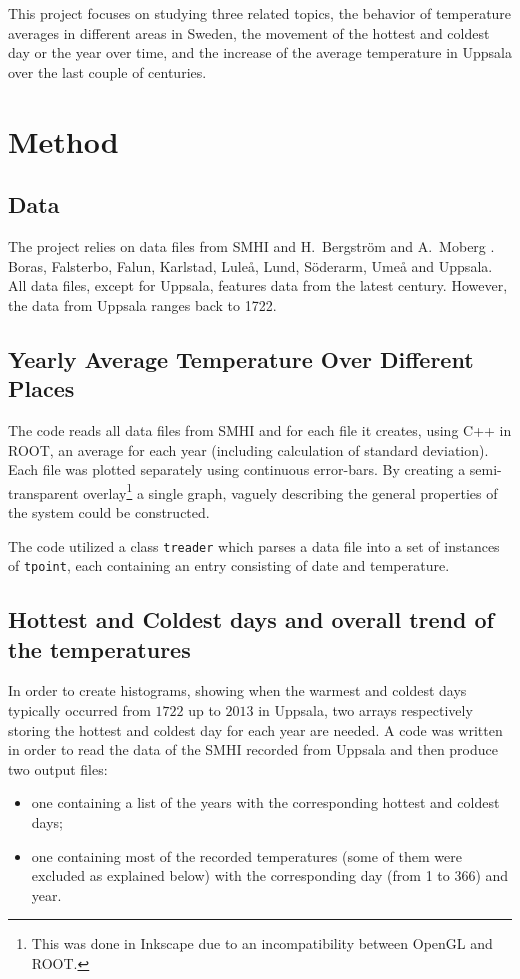 \documentclass[a4paper]{article}
\begin{document}
This project focuses on studying three related topics, the behavior of temperature averages in different areas in Sweden, the movement of the hottest and coldest day or the year over time, and the increase of the average temperature in Uppsala over the last couple of centuries.

\section{Method}\label{sec:Methods}

\subsection{Data}
The project relies on data files from SMHI and H.~Bergström and A.~Moberg \cite{Uppsala}. Boras, Falsterbo, Falun, Karlstad, Luleå, Lund, Söderarm, Umeå and Uppsala. All data files, except for Uppsala, features data from the latest century. However, the data from Uppsala ranges back to 1722.

\subsection{Yearly Average Temperature Over Different Places}

The code reads all data files from SMHI and for each file it creates, using C++ in ROOT, an average for each year (including calculation of standard deviation). Each file was plotted separately using continuous error-bars. By creating a semi-transparent overlay\footnote{This was done in Inkscape due to an incompatibility between OpenGL and ROOT.} a single graph, vaguely describing the general properties of the system could be constructed.

The code utilized a class \texttt{treader} which parses a data file into a set of instances of \texttt{tpoint}, each containing an entry consisting of date and temperature.


\subsection{Hottest and Coldest days and overall trend of the temperatures}\label{sec:Saras method}


In order to create histograms, showing when the warmest and coldest days typically occurred from $1722$ up to $2013$ in Uppsala, two
arrays respectively storing the hottest and coldest day for each year are needed. A code was written in order to read the data of
the SMHI recorded from Uppsala and then produce two output files:
\begin{itemize}
\item one containing a list of the years with the corresponding hottest and coldest days; 
\item one containing most of the recorded temperatures (some of them were excluded as explained below) with the corresponding day 
(from 1 to 366) and year.
\end{itemize}
\end{document}

